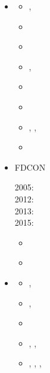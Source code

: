 \begin{itemize}
\item \fantom {}

\begin{scriptsize}
\begin{itemize}
\item[\twothousandeleven]    \textcite{thie11},  \textcite{alht11}
\item[\twothousandtwelve]    \textcite{alht12}
\item[\twothousandthirteen]  \textcite{alhf13}
\item[\twothousandfourteen]  \textcite{erhv14},  \textcite{thsh14}
\item[\twothousandfifteen]   \textcite{erhv15}
\item[\twothousandeighteen]  \textcite{sahf18}
\item[\twothousandnineteen]  \textcite{erhv19},  \textcite{thhu19},  \textcite{wohu19}
\item[\twothousandtwentyone] \textcite{erhf21}
\end{itemize}
\end{scriptsize}

\item FDCON 

\begin{scriptsize}
2005: \textcite{enbs05}\\
2012: \textcite{crsg12}\\
2013: \textcite{fusc13}\\
2015: \textcite{fuks15}
\end{scriptsize}

\item \fluidity {}

\begin{scriptsize}
\begin{itemize}
\item[\twothousandeleven]    \textcite{dawk11}
\item[\twothousandtwelve]    \textcite{krwd12}
\item[\twothousandfourteen]  \textcite{gagd14},  \textcite{ledg14}
\item[\twothousandsixteen]   \textcite{dalg16},  \textcite{jodc16} 
\item[\twothousandseventeen] \textcite{hegd17}
\item[\twothousandtwenty]    \textcite{algg20},  \textcite{mapg20}, 
                             \textcite{gatt20}
\item[\twothousandtwentyone] \textcite{sugm21},  \textcite{kndc21},
                             \textcite{befd21},  \textcite{dudm21} 
\end{itemize}
\end{scriptsize}


\end{itemize}

